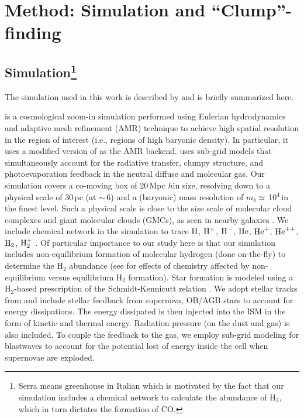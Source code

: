 \documentclass[apj]{emulateapj} %
\begin{document}
\section{Method: Simulation and ``Clump''-finding} \label{sec:sim}

\subsection{ Simulation\footnote{Serra means greenhouse in Italian which is motivated by the
fact that our simulation includes a chemical network to calculate the abundance of H$_2$, which in turn 
dictates the formation of CO.
}}  
The simulation used in this work is described by \citealt{Pallottini17a} and is briefly summarized here.

 is a cosmological zoom-in simulation performed using Eulerian hydrodynamics and 
adaptive mesh refinement (AMR) technique to achieve high spatial resolution in the region of interest (i.e., regions of high baryonic density).
In particular, it uses a modified version of  as the AMR backend.
 uses sub-grid models that simultaneously account for the radiative transfer, clumpy structure, and 
photoevaporation feedback in the neutral diffuse and molecular gas. 
Our simulation covers a co-moving box of 20\,Mpc $h$\pmOne in size, resolving 
down to a physical scale of 30\,pc (at \z$\sim$\,6) and a (baryonic) mass resolution of $m_b\simeq$\,10$^4$\,\Msun in the 
finest level.
Such a physical scale is close to the size scale of molecular cloud complexes and
giant molecular clouds (GMCs), as seen in nearby galaxies \citep[e.g.,][]{Sanders85a, Federrath13a, Goodman14a}.
We include chemical network in the simulation to trace 
$\rm{H}$, $\rm{H}^{+}$, $\rm{H}^{-}$, $\rm{He}$, $\rm{He}^{+}$, $\rm{He}^{++}$, $\rm{H}_2$, $\rm{H}_2^{+}$ \citep{Grassi14a,Bovino16a}.
Of particular importance to our study here is that 
our simulation includes non-equilibrium formation of molecular 
hydrogen (done on-the-fly) to determine the H$_2$ abundance (see \citealt{Pallottini17b} for effects of 
chemistry affected by non-equilibrium versus equilibrium H$_2$ formation). 
Star formation is modeled using a H$_2$-based prescription of the Schmidt-Kennicutt relation \citep{Krumholz09a}.
We adopt stellar tracks from  and 
include stellar feedback from supernova, OB/AGB stars to account for energy dissipations.
The energy dissipated is then injected into the ISM in the form of kinetic and thermal energy.
Radiation pressure (on the dust and gas) is also included.  %
To couple the feedback to the gas, we 
employ sub-grid modeling for blastwaves to account for the potential lost of energy inside the cell when
supernovae are exploded.
\end{document}
